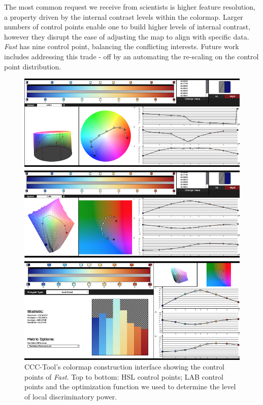 \documentclass{IEEEcsmag}
\newcommand*{\colormap}[1]{\textsl{#1}\xspace}
\newcommand*{\fast}{\colormap{Fast}}
\begin{document}
The most common request we receive from scientists is higher feature resolution, a property driven by the internal contrast levels within the colormap. Larger numbers of control points enable one to build higher levels of internal contrast, however they disrupt the ease of adjusting the map to align with specific data.  \fast has nine control point, balancing the conflicting interests. Future work includes addressing this trade - off by an automating the re-scaling on the control point distribution.




\begin{figure}[t]
\includegraphics[width=\columnwidth]{Final_Pics/30F_combo.png}
\centering
\caption{CCC-Tool's colormap construction interface showing the control points of \fast \cite{Nardini2021}. Top to bottom: HSL control points; LAB control points and the optimization function we used to determine the level of local discriminatory power.}
\label{CCC1}
\end{figure}
\end{document}
